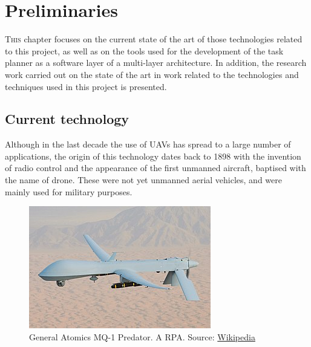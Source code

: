 \chapter{Preliminaries}
\label{ch:Preliminaries}
\lettrine[lraise=-0.1, lines=2, loversize=0.2]{T}{his} chapter focuses on the current state of the art of those technologies related to this project, as well as on the tools used for the development of the task planner as a software layer of a multi-layer architecture. In addition, the research work carried out on the state of the art in work related to the technologies and techniques used in this project is presented. 

\section{Current technology}
\label{sec:CurrentTechnology}
Although in the last decade the use of \glspl{UAV} has spread to a large number of applications, the origin of this technology dates back to 1898 with the invention of radio control and the appearance of the first unmanned aircraft, baptised with the name of drone. These were not yet unmanned aerial vehicles, and were mainly used for military purposes.

\begin{figure}[htbp]
    \centering
    \includegraphics[width=0.6\linewidth]
    {Preliminaries/figures/Predator.jpg}
    \caption{General Atomics MQ-1 Predator. A \gls{RPA}. Source: \href{https://en.wikipedia.org/wiki/General_Atomics_MQ-1_Predator}{Wikipedia}}
    \label{fig:predator}
\end{figure}

